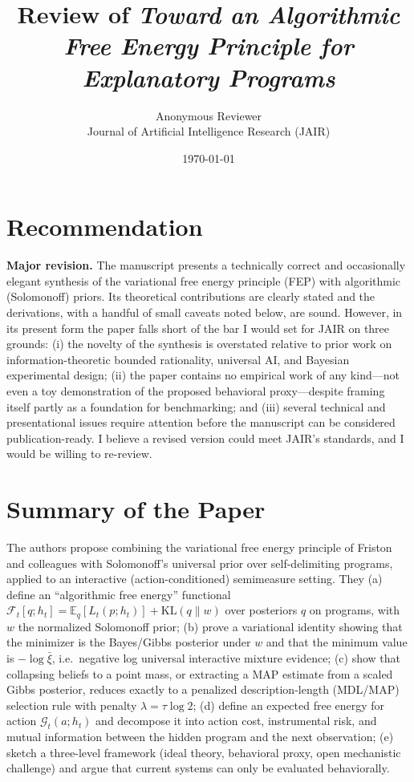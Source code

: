 \documentclass[11pt]{article}
\title{Review of \emph{Toward an Algorithmic Free Energy Principle for Explanatory Programs}}
\author{Anonymous Reviewer \\ Journal of Artificial Intelligence Research (JAIR)}
\date{\today}
\begin{document}
\maketitle

\section*{Recommendation}

\textbf{Major revision.} The manuscript presents a technically correct and occasionally elegant synthesis of the variational free energy principle (FEP) with algorithmic (Solomonoff) priors. Its theoretical contributions are clearly stated and the derivations, with a handful of small caveats noted below, are sound. However, in its present form the paper falls short of the bar I would set for JAIR on three grounds: (i) the novelty of the synthesis is overstated relative to prior work on information-theoretic bounded rationality, universal AI, and Bayesian experimental design; (ii) the paper contains no empirical work of any kind---not even a toy demonstration of the proposed behavioral proxy---despite framing itself partly as a foundation for benchmarking; and (iii) several technical and presentational issues require attention before the manuscript can be considered publication-ready. I believe a revised version could meet JAIR's standards, and I would be willing to re-review.

\section*{Summary of the Paper}

The authors propose combining the variational free energy principle of Friston and colleagues with Solomonoff's universal prior over self-delimiting programs, applied to an interactive (action-conditioned) semimeasure setting. They (a) define an ``algorithmic free energy'' functional $\mathcal{F}_t[q;h_t] = \mathbb{E}_q[L_t(p;h_t)] + \mathrm{KL}(q\|w)$ over posteriors $q$ on programs, with $w$ the normalized Solomonoff prior; (b) prove a variational identity showing that the minimizer is the Bayes/Gibbs posterior under $w$ and that the minimum value is $-\log\bar\xi$, i.e.\ negative log universal interactive mixture evidence; (c) show that collapsing beliefs to a point mass, or extracting a MAP estimate from a scaled Gibbs posterior, reduces exactly to a penalized description-length (MDL/MAP) selection rule with penalty $\lambda = \tau\log 2$; (d) define an expected free energy for action $\mathcal{G}_t(a;h_t)$ and decompose it into action cost, instrumental risk, and mutual information between the hidden program and the next observation; (e) sketch a three-level framework (ideal theory, behavioral proxy, open mechanistic challenge) and argue that current systems can only be evaluated behaviorally.
\end{document}

